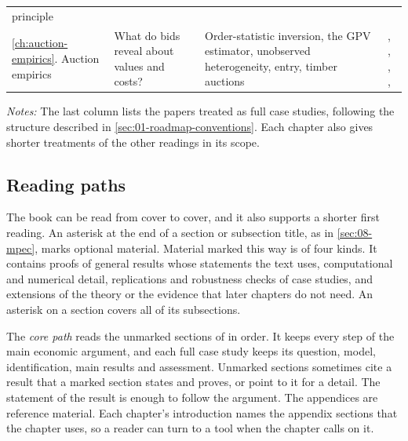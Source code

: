 \begin{table}[htbp]
\begin{tabularx}{\textwidth}{@{}>{\raggedright\arraybackslash}p{1.95cm}
  >{\raggedright\arraybackslash}X >{\raggedright\arraybackslash}X >{\raggedright\arraybackslash}X@{}}
  principle & \citet{MilgromWeber1982} \\
\ref{ch:auction-empirics}. Auction empirics & What do bids reveal about values and costs? & Order-statistic
  inversion, the GPV estimator, unobserved heterogeneity, entry, timber auctions &
  \citet{AtheyHaile2002}, \citet{AtheyHaile2007}, \citet{GuerrePerrigneVuong2000},
  \citet{Krasnokutskaya2011}, \citet{AtheyLevinSeira2011} \\
\bottomrule
\end{tabularx}
\par\smallskip
\begin{minipage}{\textwidth}\footnotesize
\textit{Notes:} The last column lists the papers treated as full case studies, following the structure
described in \cref{sec:01-roadmap-conventions}. Each chapter also gives shorter treatments of the other
readings in its scope.
\end{minipage}
\end{table}

\subsection{Reading paths}\label{sec:01-reading-paths}

The book can be read from cover to cover, and it also supports a shorter first reading. An asterisk at the end of
a section or subsection title, as in \cref{sec:08-mpec}, marks optional material. Material marked this way is of
four kinds. It contains proofs of general results whose statements the text uses, computational and numerical
detail, replications and robustness checks of case studies, and extensions of the theory or the evidence that
later chapters do not need. An asterisk on a section covers all of its subsections.

The \emph{core path} reads the unmarked sections of  in order. It keeps
every step of the main economic argument, and each full case study keeps its question, model, identification,
main results and assessment. Unmarked sections sometimes cite a result that a marked section states and proves,
or point to it for a detail. The statement of the result is enough to follow the argument. The appendices are
reference material. Each chapter's introduction names the appendix sections that the chapter uses, so a reader
can turn to a tool when the chapter calls on it.


